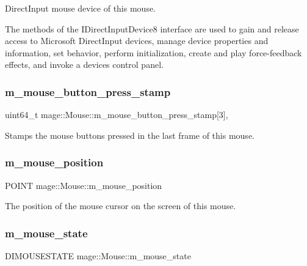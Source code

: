 Direct\+Input mouse device of this mouse.

The methods of the I\+Direct\+Input\+Device8 interface are used to gain and release access to Microsoft Direct\+Input devices, manage device properties and information, set behavior, perform initialization, create and play force-\/feedback effects, and invoke a device\textquotesingle{}s control panel. \hypertarget{classmage_1_1_mouse_a0f5a38e23bdf7eae1b7b1030a53edff0}{}\label{classmage_1_1_mouse_a0f5a38e23bdf7eae1b7b1030a53edff0} 
\subsubsection{\texorpdfstring{m\+\_\+mouse\+\_\+button\+\_\+press\+\_\+stamp}{m\_mouse\_button\_press\_stamp}}
{\footnotesize\ttfamily uint64\+\_\+t mage\+::\+Mouse\+::m\+\_\+mouse\+\_\+button\+\_\+press\+\_\+stamp\mbox{[}3\mbox{]}\hspace{0.3cm}{\ttfamily [mutable]}, {\ttfamily [protected]}}

Stamps the mouse buttons pressed in the last frame of this mouse. \hypertarget{classmage_1_1_mouse_a2a8332ef7a4daa0f9ed48a9a1ad80684}{}\label{classmage_1_1_mouse_a2a8332ef7a4daa0f9ed48a9a1ad80684} 
\subsubsection{\texorpdfstring{m\+\_\+mouse\+\_\+position}{m\_mouse\_position}}
{\footnotesize\ttfamily P\+O\+I\+NT mage\+::\+Mouse\+::m\+\_\+mouse\+\_\+position\hspace{0.3cm}{\ttfamily [protected]}}

The position of the mouse cursor on the screen of this mouse. \hypertarget{classmage_1_1_mouse_af99645fb4226077abee4532a5e663066}{}\label{classmage_1_1_mouse_af99645fb4226077abee4532a5e663066} 
\subsubsection{\texorpdfstring{m\+\_\+mouse\+\_\+state}{m\_mouse\_state}}
{\footnotesize\ttfamily D\+I\+M\+O\+U\+S\+E\+S\+T\+A\+TE mage\+::\+Mouse\+::m\+\_\+mouse\+\_\+state\hspace{0.3cm}{\ttfamily [protected]}}

